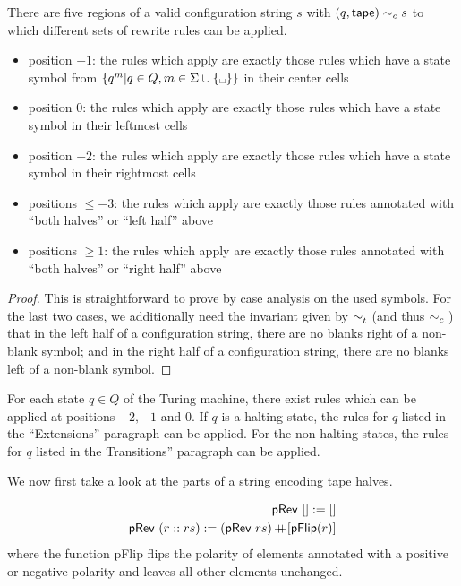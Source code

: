 \documentclass[a4paper,UKenglish,cleveref, autoref]{lipics-v2019}
\begin{document}
\begin{lemma}
  There are five regions of a valid configuration string $s$ with $(q, \textsf{tape}) \sim_c{} s$ to which different sets of rewrite rules can be applied.
  \begin{itemize}
    \item position $-1$: the rules which apply are exactly those rules which have a state symbol from $\{q^m | q \in Q, m \in \Sigma \cup \{\blank \}\}$ in their center cells
    \item position $0$: the rules which apply are exactly those rules which have a state symbol in their leftmost cells
    \item position $-2$: the rules which apply are exactly those rules which have a state symbol in their rightmost cells
    \item positions $\le -3$: the rules which apply are exactly those rules annotated with  ``both halves'' or ``left half'' above
    \item positions $\ge 1$: the rules which apply are exactly those rules annotated with ``both halves'' or ``right half'' above
  \end{itemize}
\end{lemma}
\begin{proof}
  This is straightforward to prove by case analysis on the used symbols. For the last two cases, we additionally need the invariant given by $\sim_t^{}$ (and thus $\sim_c{}$) that in the left half of a configuration string, there are no blanks right of a non-blank symbol; and in the right half of a configuration string, there are no blanks left of a non-blank symbol.
\end{proof}

\begin{lemma}
  For each state $q \in Q$ of the Turing machine, there exist rules which can be applied at positions $-2, -1$ and $0$. If $q$ is a halting state, the rules for $q$ listed in the ``Extensions'' paragraph can be applied. For the non-halting states, the rules for $q$ listed in the Transitions'' paragraph can be applied.
\end{lemma}

We now first take a look at the parts of a string encoding tape halves.

\begin{definition}
  \begin{align*}
    \textsf{pRev}~[] := [] \\
    \textsf{pRev}~(r::rs) :=  (\textsf{pRev}~rs) \mathop{{+}\!\!\!{+}} [\textsf{pFlip}(r)]
  \end{align*}
  where the function \textsf{pFlip} flips the polarity of elements annotated with a positive or negative polarity and leaves all other elements unchanged.
\end{definition}
\end{document}
